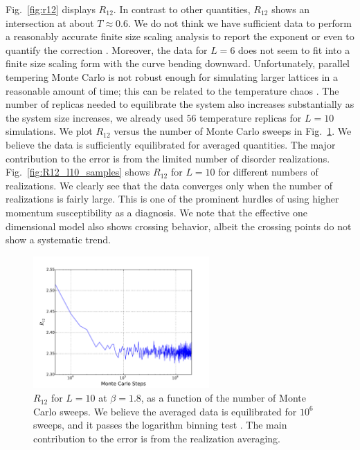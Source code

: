 Fig.~\ref{fig:r12} displays $R_{12}$. In contrast to other quantities, $R_{12}$ shows an intersection 
at about $T \approx 0.6$. We do not think we have sufficient data to perform a reasonably accurate finite size 
scaling analysis to report the exponent or even to quantify the correction \cite{Hasenbusch-etal-2008}.
Moreover, the data for $L=6$ does not seem to fit into a finite size scaling form with the curve bending downward.
Unfortunately, parallel tempering Monte Carlo is not robust enough for simulating larger lattices in a reasonable 
amount of time; this can be related to the temperature chaos \cite{Ritort-1994,Fernandez-etal-2013,Katzgraber-etal-2007}. The number of replicas needed to equilibrate the system also 
increases substantially as the system size increases, we already used $56$ temperature 
replicas for $L=10$ simulations. We plot $R_{12}$ versus the number of Monte 
Carlo sweeps in Fig.~\ref{fig:MCsteps}. We believe the data is sufficiently equilibrated for averaged quantities.
The major contribution to the error is from the limited number of disorder realizations. Fig.~\ref{fig:R12_l10_samples} shows $R_{12}$ 
for $L=10$ for different numbers of realizations. We clearly see that the data converges only when the number of realizations is fairly large.
This is one of the prominent hurdles of using higher momentum susceptibility as a diagnosis. 
We note that the effective one dimensional model also shows crossing behavior,
albeit the crossing points do not show a systematic trend\cite{Larson-etal-2013}.


\begin{figure}[ht]
\centering

  \includegraphics[width=0.6\textwidth]{img/eq_l10.pdf}
  \caption{\label{fig:MCsteps} $R_{12}$ for $L=10$ at $\beta=1.8$, as a function of the 
number of Monte Carlo sweeps.  We believe the averaged data is equilibrated 
for $10^6$  sweeps, and it passes the logarithm binning 
test \cite{Alvarez-etal-2010}. The main contribution to the error is from the realization 
averaging.}
\end{figure}


